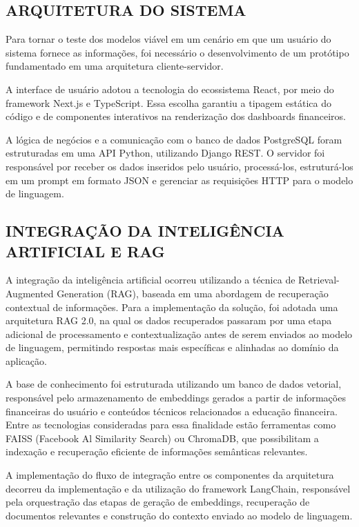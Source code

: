 \documentclass[12pt]{article}
\begin{document}
  \subsection{ARQUITETURA DO SISTEMA}

    Para tornar o teste dos modelos viável em um cenário em que um usuário do sistema fornece as informações, foi necessário o desenvolvimento de um protótipo fundamentado em uma arquitetura cliente-servidor.

    A interface de usuário adotou a tecnologia do ecossistema React, por meio do framework Next.js e TypeScript. Essa escolha garantiu a tipagem estática do código e de componentes interativos na renderização dos dashboards financeiros.

    A lógica de negócios e a comunicação com o banco de dados PostgreSQL foram estruturadas em uma API Python, utilizando Django REST. O servidor foi responsável por receber os dados inseridos pelo usuário, processá-los, estruturá-los em um prompt em formato JSON e gerenciar as requisições HTTP para o modelo de linguagem.

  \subsection{INTEGRAÇÃO DA INTELIGÊNCIA ARTIFICIAL E RAG}

    A integração da inteligência artificial ocorreu utilizando a técnica de Retrieval-Augmented Generation (RAG), baseada em uma abordagem de recuperação contextual de informações. Para a implementação da solução, foi adotada uma arquitetura RAG 2.0, na qual os dados recuperados passaram por uma etapa adicional de processamento e contextualização antes de serem enviados ao modelo de linguagem, permitindo respostas mais específicas e alinhadas ao domínio da aplicação.

    A base de conhecimento foi estruturada utilizando um banco de dados vetorial, responsável pelo armazenamento de embeddings gerados a partir de informações financeiras do usuário e conteúdos técnicos relacionados a educação financeira. Entre as tecnologias consideradas para essa finalidade estão ferramentas como FAISS (Facebook Al Similarity Search) ou ChromaDB, que possibilitam a indexação e recuperação eficiente de informações semânticas relevantes.

    A implementação do fluxo de integração entre os componentes da arquitetura decorreu da implementação e da utilização do framework LangChain, responsável pela orquestração das etapas de geração de embeddings, recuperação de documentos relevantes e construção do contexto enviado ao modelo de linguagem.
\end{document}
